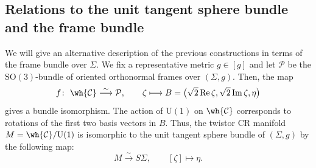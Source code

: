 \subsection{Relations to the unit tangent sphere bundle and the frame bundle}\label{sphere-bundle}
We will give an alternative description of the previous constructions in terms of the frame bundle over $\Sigma$.
We fix a representative metric $g\in[g]$ and let
$\mathcal{P}$ be the $\mathrm{SO}(3)$-bundle of oriented orthonormal frames over $(\Sigma, g)$. Then, the map
\begin{equation}\label{isom-C-hat}
f\colon\ \wh{\mathcal{C}}\overset{\sim}{\longrightarrow} \mathcal{P}, \qquad
\zeta \longmapsto B=\bigl(\sqrt{2}\operatorname{Re}\zeta, \sqrt{2}\operatorname{Im}\zeta, \eta\bigr)
\end{equation}
gives a bundle isomorphism. The action of $\mathrm{U}(1)$ on $\wh{\mathcal{C}}$ corresponds to rotations of the first two basis vectors in $B$. Thus, the twistor CR manifold $M= \wh{\mathcal{C}}/\mathrm{U}(1)$ is isomorphic to the unit tangent sphere bundle of $(\Sigma, g)$ by the following map:
\begin{equation}\label{M-isom}
M \overset{\sim}{\longrightarrow} S\Sigma, \qquad
[\zeta]\longmapsto \eta.
\end{equation}



